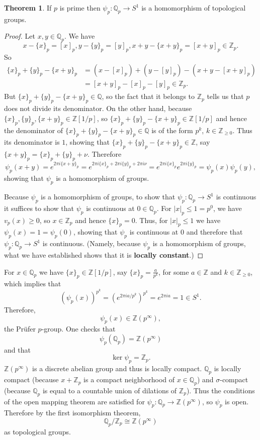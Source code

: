 \documentclass{article}
\theoremstyle{definition}
\newtheorem{theorem}{Theorem}
\theoremstyle{definition}
\begin{document}
\begin{theorem}
If $p$ is prime then $\psi_p:\mathbb{Q}_p \to S^1$ is a homomorphism of topological groups.
\label{psip}
\end{theorem}
\begin{proof}
Let $x,y \in \mathbb{Q}_p$. We have
\[
x-\{x\}_p=[x]_p,  y-\{y\}_p=[y]_p, 
x+y-\{x+y\}_p=[x+y]_p \in \mathbb{Z}_p.
\]
So
\begin{align*}
\{x\}_p+\{y\}_p-\{x+y\}_p& = (x-[x]_p)+(y-[y]_p)-(x+y-[x+y]_p)\\
&=
[x+y]_p - [x]_p - [y]_p \in \mathbb{Z}_p.
\end{align*}
But $\{x\}_p+\{y\}_p-\{x+y\}_p \in \mathbb{Q}$, so the fact that it belongs to $\mathbb{Z}_p$ tells us that $p$ does not divide
its denominator. On the other hand, because $\{x\}_p,\{y\}_p,\{x+y\}_p \in \mathbb{Z}[1/p]$, so 
$\{x\}_p+\{y\}_p-\{x+y\}_p \in \mathbb{Z}[1/p]$ and hence the denominator of $\{x\}_p+\{y\}_p-\{x+y\}_p \in \mathbb{Q}$ is of the form $p^k$, $k \in \mathbb{Z}_{\geq 0}$.
Thus its denominator is $1$, showing that $\{x\}_p+\{y\}_p-\{x+y\}_p \in \mathbb{Z}$,
say $\{x+y\}_p = \{x\}_p+\{y\}_p + \nu$.
Therefore
\[
\psi_p(x+y) = e^{2\pi i\{x+y\}_p}
=e^{2\pi i\{x\}_p + 2\pi i\{y\}_p + 2\pi i\nu}
=e^{2\pi i\{x\}_p} e^{2\pi i \{y\}_p}
=\psi_p(x) \psi_p(y),
\]
showing that $\psi_p$ is a homomorphism of groups.

Because $\psi_p$ is a homomorphism of groups, to show that $\psi_p:\mathbb{Q}_p \to S^1$ is continuous it suffices to show that
$\psi_p$ is continuous at $0 \in \mathbb{Q}_p$. 
For $|x|_p \leq 1=p^0$, we have $v_p(x) \geq 0$, so $x \in \mathbb{Z}_p$ and hence
$\{x\}_p=0$. Thus, for $|x|_p \leq 1$ we have $\psi_p(x)=1=\psi_p(0)$, showing that $\psi_p$ is continuous at $0$ and therefore
that $\psi_p:\mathbb{Q}_p \to S^1$ is continuous. (Namely, because $\psi_p$ is a homomorphism of groups, what we have
established shows that it is \textbf{locally constant}.)
\end{proof}

For $x \in \mathbb{Q}_p$ we have $\{x\}_p \in \mathbb{Z}[1/p]$, say
$\{x\}_p=\frac{a}{p^k}$, for some $a \in \mathbb{Z}$ and $k \in \mathbb{Z}_{\geq 0}$, which implies that
\[
(\psi_p(x))^{p^k} = (e^{2\pi i a/p^k})^{p^k} = e^{2\pi ia} = 1 \in S^1.
\]
Therefore,
\[
\psi_p(x) \in \mathbb{Z}(p^\infty),
\]
the Pr\"ufer $p$-group.
One checks that
\[
\psi_p(\mathbb{Q}_p) = \mathbb{Z}(p^\infty)
\]
and that
\[
\ker \psi_p = \mathbb{Z}_p.
\]
$\mathbb{Z}(p^\infty)$ is a discrete abelian group and thus is locally compact. 
$\mathbb{Q}_p$ is locally compact (because $x+\mathbb{Z}_p$ is a compact neighborhood of $x \in \mathbb{Q}_p$)
and $\sigma$-compact (because $\mathbb{Q}_p$ is equal to a countable union of dilations of $\mathbb{Z}_p$). Thus
the conditions of the open mapping theorem are satisfied for $\psi_p:\mathbb{Q}_p \to \mathbb{Z}(p^\infty)$, so
$\psi_p$ is open. Therefore by the first isomorphism theorem,
\[
\mathbb{Q}_p / \mathbb{Z}_p \cong  \mathbb{Z}(p^\infty)
\]
as topological groups.
\end{document}
